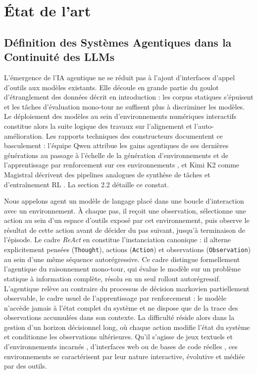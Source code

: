 \documentclass[11pt,a4paper]{article}
\begin{document}

\newpage
\section{État de l'art}

\subsection{Définition des Systèmes Agentiques dans la Continuité des LLMs}

L'émergence de l'IA agentique ne se réduit pas à l'ajout d'interfaces d'appel d'outils aux modèles existants. Elle découle en grande partie du goulot d'étranglement des données décrit en introduction : les corpus statiques s'épuisent et les tâches d'évaluation mono-tour ne suffisent plus à discriminer les modèles. Le déploiement des modèles au sein d'environnements numériques interactifs constitue alors la suite logique des travaux sur l'alignement et l'auto-amélioration. Les rapports techniques des constructeurs documentent ce basculement : l'équipe Qwen attribue les gains agentiques de ses dernières générations au passage à l'échelle de la génération d'environnements et de l'apprentissage par renforcement sur ces environnements \cite{qwen3coder2025, qwen35_2026}, et Kimi K2 comme Magistral décrivent des pipelines analogues de synthèse de tâches et d'entraînement RL \cite{kimik2_2025, magistral2025}. La section 2.2 détaille ce constat.

Nous appelons agent un modèle de langage placé dans une boucle d'interaction avec un environnement. À chaque pas, il reçoit une observation, sélectionne une action au sein d'un espace d'outils exposé par cet environnement, puis observe le résultat de cette action avant de décider du pas suivant, jusqu'à terminaison de l'épisode. Le cadre \emph{ReAct} \cite{yao2023react} en constitue l'instanciation canonique : il alterne explicitement pensées (\texttt{Thought}), actions (\texttt{Action}) et observations (\texttt{Observation}) au sein d'une même séquence autorégressive. Ce cadre distingue formellement l'agentique du raisonnement mono-tour, qui évalue le modèle sur un problème statique à information complète, résolu en un seul rollout autorégressif. L'agentique relève au contraire du processus de décision markovien partiellement observable, le cadre usuel de l'apprentissage par renforcement : le modèle n'accède jamais à l'état complet du système et ne dispose que de la trace des observations accumulées dans son contexte. La difficulté réside alors dans la gestion d'un horizon décisionnel long, où chaque action modifie l'état du système et conditionne les observations ultérieures. Qu'il s'agisse de jeux textuels et d'environnements incarnés \cite{shridhar2020alfworld}, d'interfaces web \cite{zhou2023webarena} ou de bases de code réelles \cite{jimenez2023swebench}, ces environnements se caractérisent par leur nature interactive, évolutive et médiée par des outils.
\end{document}
